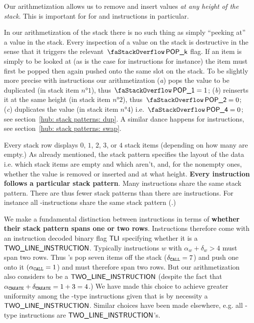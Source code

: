 \saNote{}\label{note: touch stack items at any height} Our arithmetization allows us to remove and insert values \emph{at any height of the stack}. This is important for for  and  instructions in particular.

\saNote{} In our arithmetization of the stack there is no such thing as simply ``peeking at'' a value in the stack.
Every inspection of a value on the stack is destructive in the sense that it triggers the relevant $\stackItemPop{k}$ flag.
If an item is simply to be looked at (as is the case for  instructions for instance) the item must first be popped then again pushed onto the same slot on the stack.
To be slightly more precise with  instructions our arithmetization
(\emph{a}) pops the value to be duplicated (in stack item $n°1$), thus $\stackItemPop{1} = 1$;
(\emph{b}) reinserts it at the same height (in stack item $n°2$), thus $\stackItemPop{2} = 0$;
(\emph{c}) duplicates the value (in stack item $n°4$) i.e. $\stackItemPop{4} = 0$; see section~\ref{hub: stack patterns: dup}. A similar dance happens for  instructions, see section~\ref{hub: stack patterns: swap}.

Every stack row displays $0$, $1$, $2$, $3$, or $4$ stack items (depending on how many are empty.)
As already mentioned, the stack pattern specifies the layout of the data i.e. which stack items are empty and which aren't, and, for the nonempty ones, whether the value is removed or inserted and at what height.
\textbf{Every instruction follows a particular stack pattern}. Many instructions share the same stack pattern. There are thus fewer stack patterns than there are instructions. For instance all -instructions share the same stack pattern (\dupSP.)

We make a fundamental distinction between instructions in terms of \textbf{whether their stack pattern spans one or two rows}. Instructions therefore come with an instruction decoded binary flag $\textsf{TLI}$ specifying whether it is a $\textsf{TWO\_LINE\_INSTRUCTION}$. Typically instructions $w$ with $\alpha_{w} + \delta_{w} > 4$ must span two rows. Thus 's pop seven items off the stack ($\delta_{\texttt{CALL}} = 7$) and push one onto it $(\alpha_{\texttt{CALL}} = 1$) and must therefore span two rows. But our arithmetization also considers  to be a $\textsf{TWO\_LINE\_INSTRUCTION}$ (despite the fact that $\alpha_{\texttt{CREATE}} + \delta_{\texttt{CREATE}} = 1 + 3 = 4$.) We have made this choice to achieve greater uniformity among the -type instructions given that  is by necessity a $\textsf{TWO\_LINE\_INSTRUCTION}$. Similar choices have been made elsewhere, e.g. all -type instructions are $\textsf{TWO\_LINE\_INSTRUCTION}$'s.


